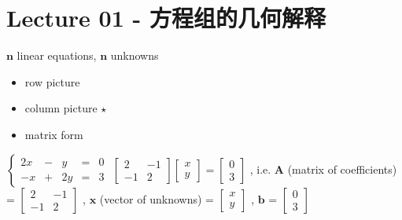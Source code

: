 \documentclass[12pt, a4paper]{article}
\begin{document}
	
{\tableofcontents}
\newpage


\section{Lecture 01 - 方程组的几何解释}
\pagestyle{fancy}
\lhead{}
\rhead{}

\noindent${\mathbf{n}}$ linear equations, ${\mathbf{n}}$ unknowns
\begin{itemize}
	\item row picture
	\item column picture {\textcolor{anhao-scarlet}{\bf{$\star$}}}
	\item matrix form
\end{itemize}
\vspace{14pt}
\begin{math}
\left\{  
\begin{array}{rclrcl}
	2x & - & y  & = & 0 \\
	-x & + & 2y & = & 3
\end{array}  
\right.
\end{math}
\newline
\begin{math}
\begin{bmatrix}
	2  & -1 \\
	-1 & 2
\end{bmatrix}
\begin{bmatrix}
	x \\
	y
\end{bmatrix}
=
\begin{bmatrix}
	0 \\
	3
\end{bmatrix}
\end{math}
, i.e.
\newline
${\mathbf{A}}$ (matrix of coefficients) = 
\begin{math}
\begin{bmatrix}
	2  & -1 \\
	-1 & 2
\end{bmatrix}
\end{math}
, ${\mathbf{x}}$ (vector of unknowns) = 
\begin{math}
\begin{bmatrix}
	x \\
	y
\end{bmatrix}
\end{math}
, ${\mathbf{b}}$ = 
\begin{math}
\begin{bmatrix}
	0 \\
	3
\end{bmatrix}
\end{math}
\end{document}
